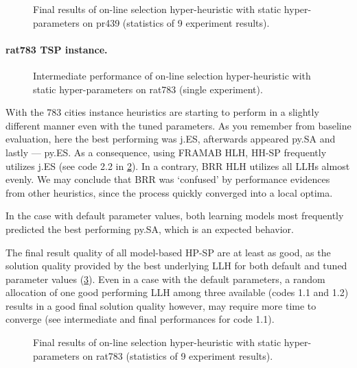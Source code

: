 \begin{figure}[b]
	\centering
	\vspace{-20pt}
	
	\caption{Final results of on-line selection hyper-heuristic with static hyper-parameters on pr439 (statistics of 9 experiment results).}
	\vspace{-5pt}
	\label{eval:pict:hh-sp:pr439 final}
\end{figure}

\newpage
\paragraph{rat783 TSP instance.}
\begin{figure}[t]
	\centering
	\vspace{-20pt}
	
	\caption{Intermediate performance of on-line selection hyper-heuristic with static hyper-parameters on rat783 (single experiment).}
	\vspace{-10pt}
	\label{eval:pict:hh-sp:rat783 intermediate}
\end{figure}
With the 783 cities instance heuristics are starting to perform in a slightly different manner even with the tuned parameters. As you remember from baseline evaluation, here the best performing was j.ES, afterwards appeared py.SA and lastly — py.ES. As a consequence, using FRAMAB HLH, HH-SP frequently utilizes j.ES (see code 2.2 in \cref{eval:pict:hh-sp:rat783 intermediate}). In a contrary, BRR HLH utilizes all LLHs almost evenly. We may conclude that BRR was `confused' by performance evidences from other heuristics, since the process quickly converged into a local optima.

In the case with default parameter values, both learning models most frequently predicted the best performing py.SA, which is an expected behavior.

The final result quality of all model-based HP-SP are at least as good, as the solution quality provided by the best underlying LLH for both default and tuned parameter values (\cref{eval:pict:hh-sp:rat783 final}). Even in a case with the default parameters, a random allocation of one good performing LLH among three available (codes 1.1 and 1.2) results in a good final solution quality however, may require more time to converge (see intermediate and final performances for code 1.1).

\begin{figure}[b]
	\centering
	\vspace{-20pt}
	
	\caption{Final results of on-line selection hyper-heuristic with static hyper-parameters on rat783 (statistics of 9 experiment results).}
	\vspace{-5pt}
	\label{eval:pict:hh-sp:rat783 final}
\end{figure}

